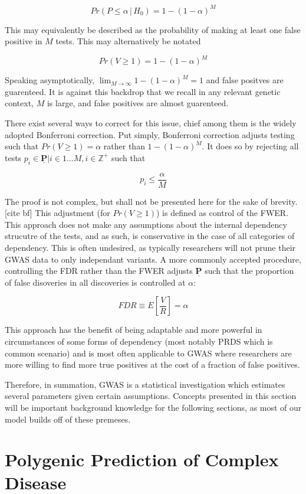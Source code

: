 $$ Pr(P \leq \alpha \, | \, H_0) = 1-(1 - \alpha)^M $$

This may equivalently be described as the probability of making at least one false positive in $M$ tests. This may alternatively be notated 

$$ Pr(V \geq 1) = 1-(1 - \alpha)^M $$

Speaking asymptotically, $\lim_{M \to \infty} 1-(1 - \alpha)^M = 1$ and false positves are guarenteed. It is against this backdrop that we recall in any relevant genetic context, $M$ is large, and false positives are almost guarenteed.

There exist several ways to correct for this issue, chief among them is the widely adopted Bonferroni correction. Put simply, Bonferroni correction adjusts testing such that $Pr(V \geq 1) = \alpha$ rather than $1-(1 - \alpha)^M$. It does so by rejecting all tests $p_i \in \underline{\mathbf{P}} | i \in 1 \dots M, i \in \mathbb{Z}^+$ such that

$$ p_i \leq \frac{\alpha}{M} $$


The proof is not complex, but shall not be presented here for the sake of brevity. [cite bf]  This adjustment (for $Pr(V \geq 1)$) is defined as control of the \ac{FWER}. This approach does not make any assumptions about the internal dependency strucutre of the tests, and as such, is conservative in the case of all categories of dependency. This is often undesired, as typically researchers will not prune their \ac{GWAS} data to only independant variants. A more commonly accepted procedure, controlling the \ac{FDR} rather than the \ac{FWER} adjusts $\underline{\mathbf{P}}$ such that the proportion of false disoveries in all discoveries is controlled at $\alpha$: 

$$ FDR \equiv E \left[ \frac{V}{R} \right] = \alpha $$

This approach has the benefit of being adaptable and more powerful in circumstances of some forms of dependency (most notably \ac{PRDS} which is common scenario) and is most often applicable to \ac{GWAS} where researchers are more willing to find more true positives at the cost of a fraction of false positives.

Therefore, in summation, \ac{GWAS} is a statistical investigation which estimates several parameters given certain assumptions. Concepts presented in this section will be important background knowledge for the following sections, as most of our model builds off of these premeses. 

\section{Polygenic Prediction of Complex Disease}

